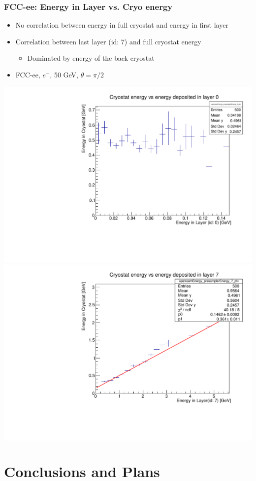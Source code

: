 \documentclass{beamer}
\begin{document}
\begin{frame}
  \frametitle{FCC-ee: Energy in Layer vs. Cryo energy}

  \begin{itemize}
    \item No correlation between energy in full cryostat and energy in first
          layer
    \item Correlation between last layer (id: 7) and full cryostat energy
          \begin{itemize}
            \item Dominated by energy of the back cryostat
          \end{itemize}
    \item FCC-ee, $e^{-}$, 50 GeV, $\theta = \pi/2$
  \end{itemize}

  \includegraphics[width=0.49\linewidth]{figures/layer0_whole_cryo.pdf}
  \includegraphics[width=0.49\linewidth]{figures/layer_7_whole_cryo.pdf}
\end{frame}


\section{Conclusions and Plans}
\end{document}
